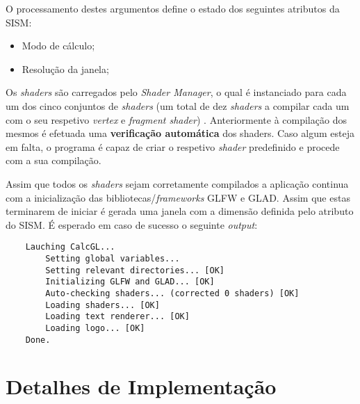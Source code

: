 O processamento destes argumentos define o estado dos seguintes atributos da \ac{SISM}:
\begin{itemize}
    \item Modo de cálculo;
    \item Resolução da janela;
\end{itemize}


Os \textit{shaders} são carregados pelo \textit{Shader Manager}, o qual é instanciado para cada um dos cinco conjuntos de \textit{shaders} (um total de dez \textit{shaders} a compilar cada um com o seu respetivo \textit{vertex} e \textit{fragment shader}) . 
Anteriormente à compilação dos mesmos é efetuada uma \textbf{verificação automática} dos shaders. Caso algum esteja em falta, o programa é capaz de criar o respetivo \textit{shader} predefinido e procede com a sua compilação.


Assim que todos os \textit{shaders} sejam corretamente compilados a aplicação continua com a inicialização das bibliotecas/\textit{frameworks} \ac{GLFW} e \ac{GLAD}. Assim que estas terminarem de iniciar é gerada uma janela com a dimensão definida pelo atributo do \ac{SISM}. 
É esperado em caso de sucesso o seguinte \textit{output}:

\begin{verbatim}
    Lauching CalcGL...
        Setting global variables...     
        Setting relevant directories... [OK]
        Initializing GLFW and GLAD... [OK]
        Auto-checking shaders... (corrected 0 shaders) [OK]
        Loading shaders... [OK]
        Loading text renderer... [OK]
        Loading logo... [OK]
    Done.
\end{verbatim}

\section{Detalhes de Implementação}
\label{sec::impl:detalhes}






